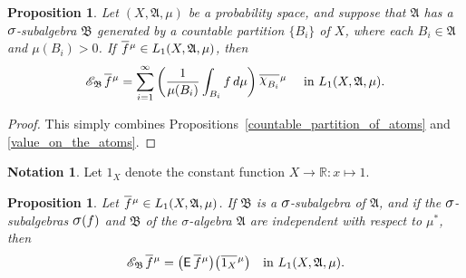\documentclass[
twoside=true,
paper=letter,
fontsize=9pt,
pagesize=auto,
leqno,
openany,
headsepline,
overfullrule,
]{scrbook}
\theoremstyle{plain}
\theoremstyle{plain}
\newtheorem{prop}[thm]{Proposition}
\theoremstyle{definition}
\newtheorem{notn}[thm]{Notation}
\theoremstyle{bfnoteitalic}
\theoremstyle{bfnoteroman}
\newcommand{\sigalg}[1]{\mathfrak{#1}}
\newcommand{\cali}[1]{\mathscr{#1}}
\newcommand{\sfop}[1]{\mathsf{#1}}
\newcommand{\expval}{\sfop{E}\,}
\newcommand{\condexpsub}[2]
{\mathop{\cali{E}\hspace{-1.5pt}}\nolimits_{#2}\hspace{-1pt}#1}
\newcommand{\sagb}{\mathop{\hbox{\large{$\sigma$}}}\nolimits}
\newcommand{\textsigma}{\hbox{\large{$\sigma$}}\kern-1pt}
\newcommand{\charfunction}[1]{{\raisebox{2pt}{$\chi$}}_{#1}}
\newcommand{\R}{\mathbb{R}}
\newcommand{\sigmaalgebra}{\sigalg{A}}
\newcommand{\sigmaalgebraii}{\sigalg{B}}
\newcommand{\oneonomega}{1_\measurespace}
\newcommand{\sigalgb}{\sigmaalgebraii}
\newcommand{\function}{f}
\newcommand{\measurespace}{X}
\newcommand{\mspaceelt}{x}
\newcommand{\measure}{\mu}
\newcommand*\xbar[1]{%
   \hbox{%
     \vbox{%
       \hrule height 0.4pt %
       \kern0.4ex%
       \hbox{%
         \ensuremath{#1}%
       }%
     }%
   }%
}
\newcommand{\lebclass}[1]{\hspace{.5pt}\xbar{#1}\hspace{0.5pt}}
\newcommand{\ellclass}[2]{\lebclass{#1}^{#2}}
\begin{document}
\begin{prop}\label{conditional_expectation_countable}
Let $(\measurespace, \sigmaalgebra,\measure)$ be a probability space, and suppose that $\sigmaalgebra$ has a 
$\textsigma$-subalgebra $\sigmaalgebraii$ generated by a countable partition $\{B_i\}$ of $\measurespace$, where each $B_i\in\sigmaalgebra$ and $\measure(B_i)>0$. 
If $\ellclass{\function}{\measure} \in L_1(\measurespace, \sigmaalgebra,\measure)$, then
\[
\condexpsub{\ellclass{\function}{\measure}}{\sigalgb}
=
\sum_{i=1}^{\infty}
\left(
\frac{1}{\measure(B_i)}
\int_{B_i} \function\, d\measure
\right)
\ellclass{\charfunction{B_i}}{\measure}
\quad \text{ in $L_1(\measurespace, \sigmaalgebra,\measure)$.}
\]
\end{prop}

\begin{proof}
This simply combines Propositions~\ref{countable_partition_of_atoms} and \ref{value_on_the_atoms}.
\end{proof}



\begin{notn}
Let $\oneonomega$ denote the constant function $\measurespace\to\R:\mspaceelt\mapsto 1$.
\end{notn}




\begin{prop}\label{conditional_is_expected}
Let $\ellclass{\function}{\measure}\in L_1(\measurespace, \sigmaalgebra,\measure)$.
If $\sigmaalgebraii$ is a $\textsigma$-subalgebra of $\sigmaalgebra$, and if the 
$\textsigma$-subalgebras $\sagb(\function)$ and 
$\sigmaalgebraii$ of the \textsigma-algebra $\sigmaalgebra$ are independent with respect to $\measure^*$, then
\[
\condexpsub{\ellclass{\function}{\measure}}{\sigmaalgebraii}
=  
\bigl(\expval{\ellclass{\function}{\measure}}\bigr)
\bigl(\ellclass{\oneonomega}{\measure}\bigr) 
\quad
\text{in $L_1(\measurespace, \sigmaalgebra,\measure)$.}
\]
\end{prop}
\end{document}
